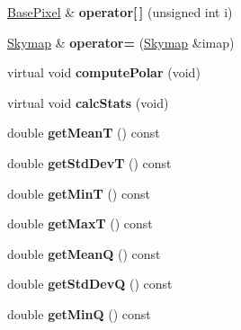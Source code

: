\begin{DoxyCompactItemize}
\item 
\hypertarget{classSkymap_a2c772a9e2fe17673884b9d1d17f753e2}{
\hyperlink{classBasePixel}{BasePixel} \& {\bfseries operator\mbox{[}$\,$\mbox{]}} (unsigned int i)}
\label{classSkymap_a2c772a9e2fe17673884b9d1d17f753e2}

\item 
\hypertarget{classSkymap_a2cead85b549a4f92287df56d40a984b4}{
\hyperlink{classSkymap}{Skymap} \& {\bfseries operator=} (\hyperlink{classSkymap}{Skymap} \&imap)}
\label{classSkymap_a2cead85b549a4f92287df56d40a984b4}

\item 
\hypertarget{classSkymap_aa369f2087f2154dae5139c15cc620c8e}{
virtual void {\bfseries computePolar} (void)}
\label{classSkymap_aa369f2087f2154dae5139c15cc620c8e}

\item 
\hypertarget{classSkymap_a8435d7021b9215ebe31c3f5236894af7}{
virtual void {\bfseries calcStats} (void)}
\label{classSkymap_a8435d7021b9215ebe31c3f5236894af7}

\item 
\hypertarget{classSkymap_ad6d01c87ccd1ff33f680dae9b38c9e66}{
double {\bfseries getMeanT} () const }
\label{classSkymap_ad6d01c87ccd1ff33f680dae9b38c9e66}

\item 
\hypertarget{classSkymap_a9aaf7a1cbb4e60d30ddb4ad2912daa3d}{
double {\bfseries getStdDevT} () const }
\label{classSkymap_a9aaf7a1cbb4e60d30ddb4ad2912daa3d}

\item 
\hypertarget{classSkymap_af9d22467da8c446691520cb26d90cbe0}{
double {\bfseries getMinT} () const }
\label{classSkymap_af9d22467da8c446691520cb26d90cbe0}

\item 
\hypertarget{classSkymap_a2c359b108a9aba30a8811a5b6a8d1015}{
double {\bfseries getMaxT} () const }
\label{classSkymap_a2c359b108a9aba30a8811a5b6a8d1015}

\item 
\hypertarget{classSkymap_ab88a0449b3f747addfd23b21efca0844}{
double {\bfseries getMeanQ} () const }
\label{classSkymap_ab88a0449b3f747addfd23b21efca0844}

\item 
\hypertarget{classSkymap_a902a8c9474388bbbfbea1d12a9c353ce}{
double {\bfseries getStdDevQ} () const }
\label{classSkymap_a902a8c9474388bbbfbea1d12a9c353ce}

\item 
\hypertarget{classSkymap_af980c82699488b98e3a825201bba6d02}{
double {\bfseries getMinQ} () const }
\label{classSkymap_af980c82699488b98e3a825201bba6d02}


\end{DoxyCompactItemize}

